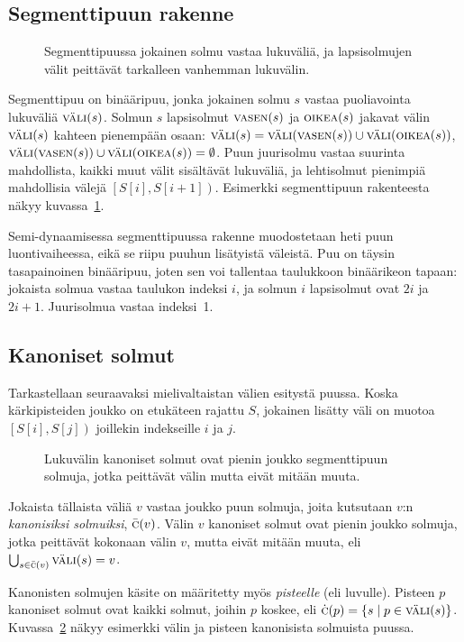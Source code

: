 \documentclass[finnish]{tktltiki2}
\theoremstyle{definition}
\theoremstyle{remark}
\newcommand\range[2]{\ensuremath{\left [ #1 , #2 \right )}\xspace}
\newcommand\set[1]{\ensuremath{\left\{#1\right\}}\xspace}
\newcommand\epts{\ensuremath{S}\xspace}
\newcommand\inter[1]{\ensuremath{\textsc{väli}(#1)}\xspace}
\newcommand\leftc[1]{\ensuremath{\textsc{vasen}(#1)}\xspace}
\newcommand\rightc[1]{\ensuremath{\textsc{oikea}(#1)}\xspace}
\newcommand\canon[1]{\ensuremath{\bar{\textsc{c}}(#1)}\xspace}
\newcommand\canonp[1]{\ensuremath{\dot{\textsc{c}}(#1)}\xspace}
\begin{document}
\subsection{Segmenttipuun rakenne}

\begin{figure}
\caption{Segmenttipuussa jokainen solmu vastaa lukuväliä, ja lapsisolmujen välit peittävät tarkalleen vanhemman lukuvälin.}\label{segpuu}
\end{figure}

Segmenttipuu on binääripuu, jonka jokainen solmu $s$ vastaa puoliavointa lukuväliä $\inter{s}$.
Solmun $s$ lapsisolmut $\leftc{s}$ ja $\rightc{s}$ jakavat välin $\inter{s}$ kahteen pienempään osaan: $\inter{s}=\inter{\leftc{s}}\cup\inter{\rightc{s}}$, $\inter{\leftc{s}}\cup\inter{\rightc{s}}=\emptyset$.
Puun juurisolmu vastaa suurinta mahdollista, kaikki muut välit sisältävät lukuväliä, ja lehtisolmut pienimpiä mahdollisia välejä $\range{\epts[i]}{\epts[i+1]}$.
Esimerkki segmenttipuun rakenteesta näkyy kuvassa~\ref{segpuu}.

Semi-dynaamisessa segmenttipuussa rakenne muodostetaan heti puun luontivaiheessa, eikä se riipu puuhun lisätyistä väleistä.
Puu on täysin tasapainoinen binääripuu, joten sen voi tallentaa taulukkoon binäärikeon tapaan: jokaista solmua vastaa taulukon indeksi $i$, ja solmun $i$ lapsisolmut ovat $2i$ ja $2i+1$.
Juurisolmua vastaa indeksi~1.

\subsection{Kanoniset solmut}

Tarkastellaan seuraavaksi mielivaltaistan välien esitystä puussa.
Koska kärkipisteiden joukko on etukäteen rajattu $\epts$, jokainen lisätty väli on muotoa $\range{\epts[i]}{\epts[j]}$ joillekin indekseille $i$ ja $j$.

\begin{figure}
\caption{Lukuvälin kanoniset solmut ovat pienin joukko segmenttipuun solmuja, jotka peittävät välin mutta eivät mitään muuta.}\label{kanon}
\end{figure}

Jokaista tällaista väliä $v$ vastaa joukko puun solmuja, joita kutsutaan $v$:n \emph{kanonisiksi solmuiksi}, $\canon{v}$.
Välin $v$ kanoniset solmut ovat pienin joukko solmuja, jotka peittävät kokonaan välin $v$, mutta eivät mitään muuta, eli $\bigcup_{s\in\canon{v}}\inter{s}=v$.

Kanonisten solmujen käsite on määritetty myös \emph{pisteelle} (eli luvulle).
Pisteen $p$ kanoniset solmut ovat kaikki solmut, joihin $p$ koskee, eli $\canonp{p}=\set{s \mid p\in\inter{s}}$.
Kuvassa~\ref{kanon} näkyy esimerkki välin ja pisteen kanonisista solmuista puussa.
\end{document}
